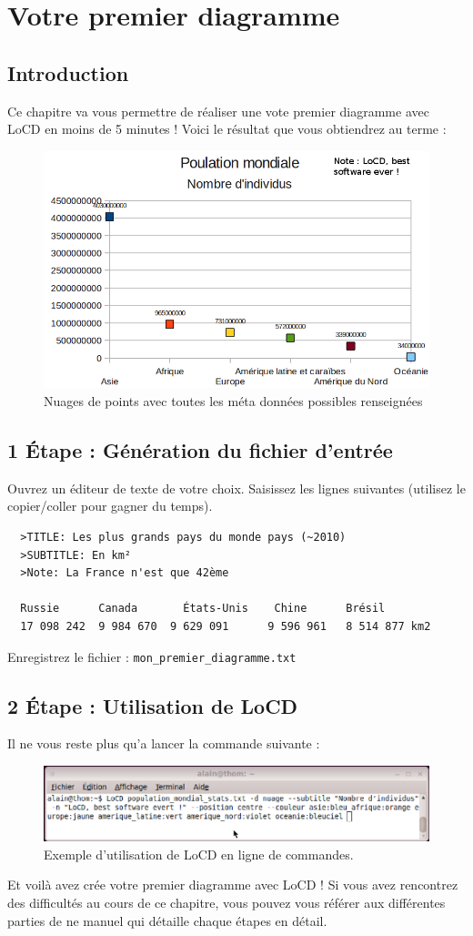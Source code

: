 \chapter{Votre premier diagramme}
\section{Introduction}
Ce chapitre va vous permettre de réaliser une vote premier diagramme avec LoCD en moins de 5 minutes  \smiley ! Voici le résultat que vous obtiendrez au terme : 
\begin{figure}[htbp]
  \centering
  \includegraphics[scale=0.60]{img/diagrammenuages}
  \caption{Nuages de points avec toutes les méta données possibles renseignées}
  \label{fig:dnuages}
\end{figure}

\section{1 \'Etape : Génération du fichier d'entrée}
Ouvrez un éditeur de texte de votre choix. Saisissez les lignes suivantes (utilisez le copier/coller pour gagner du temps).
\begin{verbatim}
  >TITLE: Les plus grands pays du monde pays (~2010)
  >SUBTITLE: En km²
  >Note: La France n'est que 42ème

  Russie      Canada 	   États-Unis    Chine 	    Brésil 
  17 098 242  9 984 670  9 629 091  	9 596 961   8 514 877 km2 	
\end{verbatim}
Enregistrez le fichier : \verb+mon_premier_diagramme.txt+
\section{2 \'Etape : Utilisation de LoCD}
Il ne vous reste plus qu'a lancer la commande suivante :
  \begin{figure}[htbp]
    \centering
    \includegraphics[scale=0.40]{img/ecommandes}
    \caption{Exemple d'utilisation de LoCD en ligne de commandes.}
    \label{fig:ecommandes}
  \end{figure} 
  
Et voilà avez crée votre premier diagramme avec LoCD ! Si vous avez rencontrez des difficultés au cours de ce chapitre, vous pouvez vous référer aux différentes parties de ne manuel qui détaille chaque étapes en détail.
